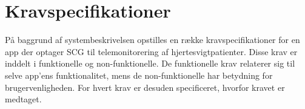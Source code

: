 \section{Kravspecifikationer}
På baggrund af systembeskrivelsen opstilles en række kravspecifikationer for en app der optager SCG til telemonitorering af hjertesvigtpatienter. Disse krav er inddelt i funktionelle og non-funktionelle. De funktionelle krav relaterer sig til selve app'ens funktionalitet, mens de non-funktionelle har betydning for brugervenligheden. For hvert krav er desuden specificeret, hvorfor kravet er medtaget.





